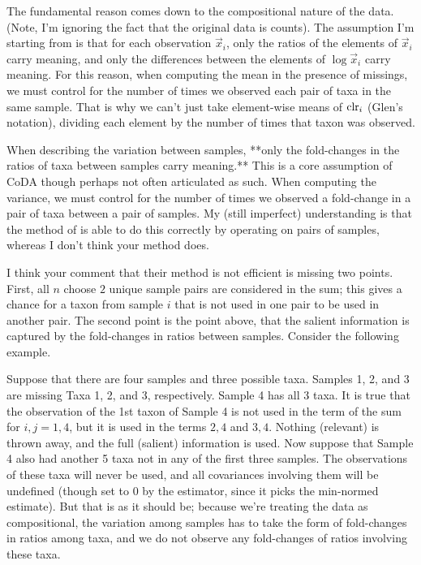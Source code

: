 The fundamental reason comes down to the compositional nature of the data.
(Note, I'm ignoring the fact that the original data is counts). The assumption
I'm starting from is that for each observation $\vec x_i$, only the ratios of
the elements of $\vec x_i$ carry meaning, and only the differences between the
elements of $\log \vec x_i$ carry meaning. For this reason, when computing the
mean in the presence of missings, we must control for the number of times we
observed each pair of taxa in the same sample. That is why we can't just take
element-wise means of $\operatorname{clr}_i$ (Glen's notation), dividing each element by the
number of times that taxon was observed. 

When describing the variation between samples, **only the fold-changes in the
ratios of taxa between samples carry meaning.** This is a core assumption of
CoDA though perhaps not often articulated as such. When computing the variance,
we must control for the number of times we observed a fold-change in a pair of
taxa between a pair of samples. My (still imperfect) understanding is that the
method of \textcite{vandenBoogaart2006} is able to do this correctly by
operating on pairs of samples, whereas I don't think your method does.

I think your comment that their method is not efficient is missing two points.
First, all $n$ choose $2$ unique sample pairs are considered in the sum; this
gives a chance for a taxon from sample $i$ that is not used in one pair to be
used in another pair. The second point is the point above, that the salient
information is captured by the fold-changes in ratios between samples. Consider
the following example.

Suppose that there are four samples and three possible taxa. Samples 1, 2, and
3 are missing Taxa 1, 2, and 3, respectively. Sample 4 has all 3 taxa. It is
true that the observation of the 1st taxon of Sample 4 is not used in the term
of the sum for $i,j = 1,4$, but it is used in the terms $2,4$ and $3,4$.
Nothing (relevant) is thrown away, and the full (salient) information is used.
Now suppose that Sample 4 also had another 5 taxa not in any of the first three
samples. The observations of these taxa will never be used, and all covariances
involving them will be undefined (though set to 0 by the estimator, since it
picks the min-normed estimate). But that is as it should be; because we're
treating the data as compositional, the variation among samples has to take the
form of fold-changes in ratios among taxa, and we do not observe any
fold-changes of ratios involving these taxa.

